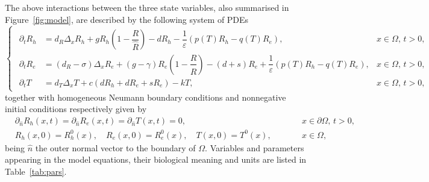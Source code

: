 \documentclass[11pt]{elsarticle}
\theoremstyle{plain}
\theoremstyle{definition}
\theoremstyle{myremark}
\begin{document}
The above interactions between the three state variables, also summarised in Figure~\ref{fig:model}, are described by the following system of PDEs
\begin{equation}
\begin{cases}
\begin{aligned}
\partial_t R_h &=d_R \Delta_x R_h 
    +g R_h \left(1-\dfrac{R}{\hat{R}}\right)-dR_h-\dfrac{1}{\varepsilon}\left(p(T)R_h-q(T)R_e\right), & x \in \Omega, \, t>0,\\[0.3cm]
\partial_t R_e&=(d_R-\sigma) \Delta_x R_e 
    +(g-\gamma) R_e \left(1-\dfrac{R}{\hat{R}}\right) -(d+s)R_e+\dfrac{1}{\varepsilon}\left(p(T)R_h-q(T)R_e\right),& x \in \Omega, \, t>0,\\[0.3cm]
\partial_t T&= d_T \Delta_x T 
    +c(dR_h+dR_e+sR_e)-kT, &x \in \Omega, \, t>0,
\end{aligned}
\end{cases}\label{eq:fastreaction}
\end{equation}
together with homogeneous Neumann boundary conditions and nonnegative initial conditions respectively given by
\begin{equation} \label{eq:BIC}
\begin{aligned}
    &\partial_{\hat{n}} R_h(x,t) = \partial_{\hat{n}} R_e(x,t) = \partial_{\hat{n}} T(x,t) = 0, \qquad &&x \in \partial \Omega, \, t>0, \\
    &R_h(x,0) = R_h^0(x), \quad R_e(x,0) = R_e^0(x), \quad T(x,0) = T^0(x), \qquad &&x \in \Omega,
\end{aligned}
\end{equation}
being $\hat{n}$ the outer normal vector to the boundary of $\Omega$. 
Variables and parameters appearing in the model equations, their biological meaning and units are listed in Table~\ref{tab:pars}. 
\end{document}

